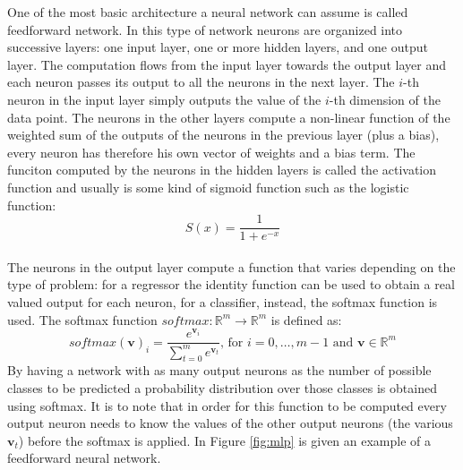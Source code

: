 \documentclass[12pt]{article}
\newcommand{\vect}[1]{\boldsymbol{#1}}
\begin{document}
One of the most basic architecture a neural network can assume is called feedforward network. In this type of network neurons are organized into successive layers: one input layer, one or more hidden layers, and one output layer. The computation flows from the input layer towards the output layer and each neuron passes its output to all the neurons in the next layer. The $i$-th neuron in the input layer simply outputs the value of the $i$-th dimension of the data point. The neurons in the other layers compute a non-linear function of the weighted sum of the outputs of the neurons in the previous layer (plus a bias), every neuron has therefore his own vector of weights and a bias term. The funciton computed by the neurons in the hidden layers is called the activation function and usually is some kind of sigmoid function such as the logistic function:
\begin{equation}
\label{eq:sigmoid}
S(x) = \frac{1}{1 + e^{-x}}
\end{equation}\\
The neurons in the output layer compute a function that varies depending on the type of problem: for a regressor the identity function can be used to obtain a real valued output for each neuron, for a classifier, instead, the softmax function is used. The softmax function $ softmax: \mathbb{R}^m \rightarrow \mathbb{R}^m $ is defined as:
\begin{equation}
\label{eq:softmax}
softmax(\vect{v})_i = \frac{e^{\vect{v}_i}}{\sum_{t=0}^{m}e^{\vect{v}_t}} \text{, for } i = 0,\ldots,m-1 \text{ and } \vect{v} \in \mathbb{R}^m
\end{equation}
By having a network with as many output neurons as the number of possible classes to be predicted a probability distribution over those classes is obtained using softmax. It is to note that in order for this function to be computed every output neuron needs to know the values of the other output neurons (the various $ \vect{v}_t$) before the softmax is applied. In Figure \ref{fig:mlp} is given an example of a feedforward neural network.
\end{document}
